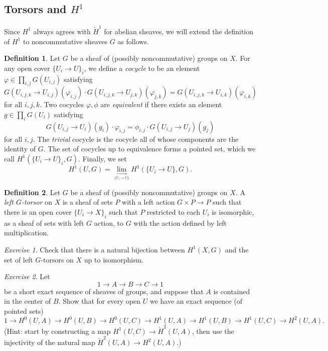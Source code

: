 \documentclass[letterpaper,11pt]{article}
\theoremstyle{definition}
\newtheorem{defn}{Definition}
\theoremstyle{remark}
\newtheorem{exer}{Exercise}
\begin{document}
\subsection{Torsors and $H^1$}

Since $H^1$ always agrees with $\check{H}^1$ for abelian sheaves, we will extend the definition of $H^1$ to noncommutative sheaves $G$ as follows.

\begin{defn} Let $G$ be a sheaf of (possibly noncommutative) groups on $X$. For any open cover $\{U_i\rightarrow U\}_i$, we define a \emph{cocycle} to be an element $\varphi \in \prod_{i,j} G(U_{i,j})$ satisfying
\[
G(U_{i,j,k}\rightarrow U_{i,j})(\varphi_{i,j})\cdot G(U_{i,j,k}\rightarrow U_{j,k})(\varphi_{j,k}) = G(U_{i,j,k}\rightarrow U_{i,k})(\varphi_{i,k})
\]
for all $i,j,k$. Two cocycles $\varphi, \phi$ are \emph{equivalent} if there exists an element $g \in \prod_i G(U_i)$ satisfying
\[
G(U_{i,j}\rightarrow U_i)(g_i)\cdot \varphi_{i,j} = \phi_{i,j}\cdot G(U_{i,j}\rightarrow U_j)(g_j)
\]
for all $i,j$. The \emph{trivial} cocycle is the cocycle all of whose components are the identity of $G$. The set of cocycles up to equivalence forms a pointed set, which we call $H^1(\{U_i\rightarrow U\}_i,G)$. Finally, we set
\[
H^1(U,G) = \underset{\underset{\{U_i\rightarrow U\}}{\longrightarrow}}{\lim} H^1(\{U_i\rightarrow U\}, G).
\]
\end{defn}

\begin{defn} Let $G$ be a sheaf of (possibly noncommutative) groups on $X$. A \emph{left $G$-torsor} on $X$ is a sheaf of sets $P$ with a left action $G\times P\rightarrow P$ such that there is an open cover $\{U_i\rightarrow X\}_i$ such that $P$ restricted to each $U_i$ is isomorphic, as a sheaf of sets with left $G$ action, to $G$ with the action defined by left multiplication.
\end{defn}

\begin{exer} Check that there is a natural bijection between $H^1(X,G)$ and the set of left $G$-torsors on $X$ up to isomorphism.
\end{exer}

\begin{exer} Let
\[
1 \rightarrow A \rightarrow B \rightarrow C \rightarrow 1
\]
be a short exact sequence of sheaves of groups, and suppose that $A$ is contained in the center of $B$. Show that for every open $U$ we have an exact sequence (of pointed sets)
\[
1 \rightarrow H^0(U,A) \rightarrow H^0(U,B) \rightarrow H^0(U,C) \rightarrow H^1(U,A) \rightarrow H^1(U,B) \rightarrow H^1(U,C) \rightarrow H^2(U,A).
\]
(Hint: start by constructing a map $H^1(U,C) \rightarrow \check{H}^2(U,A)$, then use the injectivity of the natural map $\check{H}^2(U,A) \rightarrow H^2(U,A)$.)
\end{exer}
\end{document}
